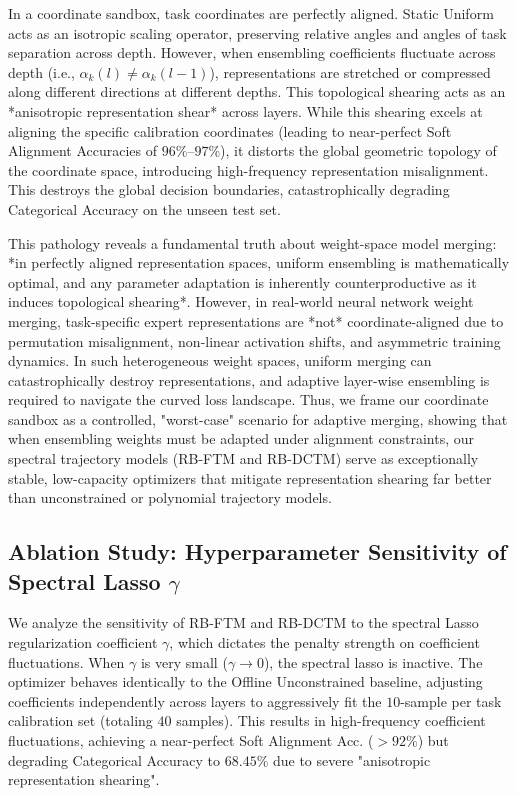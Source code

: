 In a coordinate sandbox, task coordinates are perfectly aligned. Static Uniform acts as an isotropic scaling operator, preserving relative angles and angles of task separation across depth. However, when ensembling coefficients fluctuate across depth (i.e., $\alpha_k(l) \neq \alpha_k(l-1)$), representations are stretched or compressed along different directions at different depths. This topological shearing acts as an *anisotropic representation shear* across layers. While this shearing excels at aligning the specific calibration coordinates (leading to near-perfect Soft Alignment Accuracies of $96\%$--$97\%$), it distorts the global geometric topology of the coordinate space, introducing high-frequency representation misalignment. This destroys the global decision boundaries, catastrophically degrading Categorical Accuracy on the unseen test set.

This pathology reveals a fundamental truth about weight-space model merging: *in perfectly aligned representation spaces, uniform ensembling is mathematically optimal, and any parameter adaptation is inherently counterproductive as it induces topological shearing*. However, in real-world neural network weight merging, task-specific expert representations are *not* coordinate-aligned due to permutation misalignment, non-linear activation shifts, and asymmetric training dynamics. In such heterogeneous weight spaces, uniform merging can catastrophically destroy representations, and adaptive layer-wise ensembling is required to navigate the curved loss landscape. Thus, we frame our coordinate sandbox as a controlled, "worst-case" scenario for adaptive merging, showing that when ensembling weights must be adapted under alignment constraints, our spectral trajectory models (RB-FTM and RB-DCTM) serve as exceptionally stable, low-capacity optimizers that mitigate representation shearing far better than unconstrained or polynomial trajectory models.


\subsection{Ablation Study: Hyperparameter Sensitivity of Spectral Lasso $\gamma$}
\label{sec:appendix_gamma_ablation}
We analyze the sensitivity of RB-FTM and RB-DCTM to the spectral Lasso regularization coefficient $\gamma$, which dictates the penalty strength on coefficient fluctuations. When $\gamma$ is very small ($\gamma \to 0$), the spectral lasso is inactive. The optimizer behaves identically to the Offline Unconstrained baseline, adjusting coefficients independently across layers to aggressively fit the $10$-sample per task calibration set (totaling $40$ samples). This results in high-frequency coefficient fluctuations, achieving a near-perfect Soft Alignment Acc. ($>92\%$) but degrading Categorical Accuracy to $68.45\%$ due to severe "anisotropic representation shearing".

